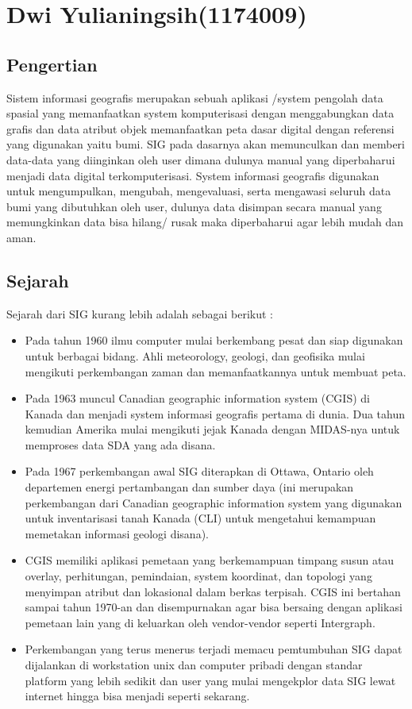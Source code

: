 \section{Dwi Yulianingsih(1174009)}
\subsection{Pengertian}
Sistem informasi geografis merupakan sebuah aplikasi /system pengolah data spasial yang memanfaatkan system komputerisasi dengan menggabungkan data grafis dan data atribut objek memanfaatkan peta dasar digital dengan referensi yang digunakan yaitu bumi. SIG pada dasarnya akan memunculkan dan memberi data-data yang diinginkan oleh user dimana dulunya manual yang diperbaharui menjadi data digital terkomputerisasi. System informasi geografis digunakan untuk mengumpulkan, mengubah, mengevaluasi, serta mengawasi seluruh data bumi yang dibutuhkan oleh user, dulunya data disimpan secara manual yang memungkinkan data bisa hilang/ rusak maka diperbaharui agar lebih mudah dan aman.

\subsection{Sejarah}
Sejarah dari SIG kurang lebih adalah sebagai berikut :
\begin{itemize}
\item Pada tahun 1960 ilmu computer mulai berkembang pesat dan siap digunakan untuk berbagai bidang. Ahli meteorology, geologi, dan 	geofisika mulai mengikuti perkembangan zaman dan memanfaatkannya  untuk membuat peta.
\item  Pada 1963 muncul Canadian geographic information system (CGIS) di Kanada dan menjadi system informasi geografis pertama di dunia. Dua tahun kemudian Amerika mulai mengikuti jejak Kanada dengan MIDAS-nya untuk memproses data SDA yang ada disana. 
\item Pada 1967 perkembangan awal SIG diterapkan di Ottawa, Ontario oleh departemen energi pertambangan dan sumber daya (ini merupakan perkembangan dari Canadian geographic information system yang digunakan untuk inventarisasi tanah Kanada (CLI) untuk mengetahui kemampuan memetakan informasi geologi disana).  
\item CGIS memiliki aplikasi pemetaan yang berkemampuan timpang susun atau overlay, perhitungan, pemindaian, system koordinat, dan topologi yang menyimpan atribut dan lokasional dalam berkas terpisah. CGIS ini bertahan sampai tahun 1970-an dan disempurnakan agar bisa bersaing dengan aplikasi pemetaan lain yang di keluarkan oleh vendor-vendor seperti Intergraph. 
\item Perkembangan yang terus menerus terjadi memacu pemtumbuhan SIG dapat dijalankan di workstation unix dan computer pribadi dengan standar platform yang lebih sedikit dan user yang mulai mengekplor data SIG lewat internet hingga bisa menjadi seperti sekarang.
\end{itemize}

